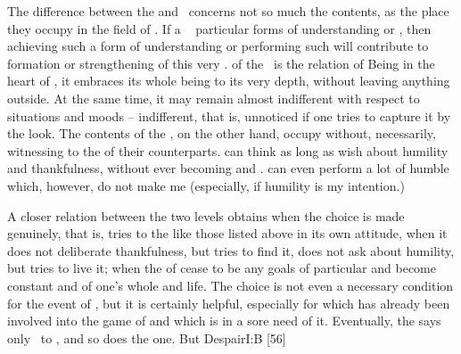 \pa\label{pa:sameSame}
The difference between the  and  \Yes\ concerns 
not so much the contents, as the 
place they occupy in the field of .
If a \nexus\  particular forms of understanding or , then
achieving such a form of understanding or performing such  will contribute
to formation or strengthening of this very \nexus. 
 of the
 \yes\ is the relation of Being in the heart of , it
embraces its whole being to its very depth, without leaving anything outside. At
the same time, it may remain almost indifferent with respect to 
situations and moods -- indifferent, that is, unnoticed if one tries to capture
it by the  look. The contents of the  \yes, on the
other hand, occupy  without, necessarily, witnessing to the
 of their  counterparts.  can think as long as
 wish about humility and thankfulness, without ever becoming 
and .  can even perform a lot of humble  which,
however, do not make me  (especially, if humility is my intention.)

A closer relation between the two levels obtains when the  choice
is made genuinely, that is,  tries to  the 
like those listed above in its own attitude, when it does not deliberate
thankfulness, but tries to find it, does not ask about humility, but tries to
live it; when the  of  cease to be any goals of particular
 and become constant  and  of one's whole
 and life.  The  choice is not even a necessary
condition for the  event of \yes, but it is certainly helpful,
especially for  which has already been involved into the game of
 and which is in a sore need of  it.  Eventually,
the  says only \yes\ to , and so does the
 one. But \citet{[i]t requires an eminent reflection, or rather a
  great faith, to sustain a reflection on nothing, which is to say infinite
  reflection.}{Despair}{I:B [56]}

